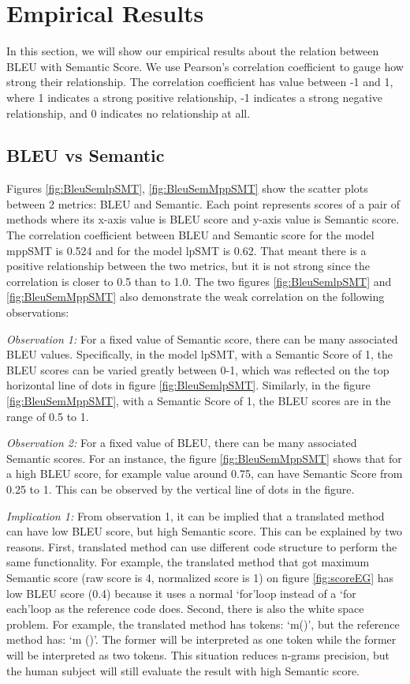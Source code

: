 \section{Empirical Results}
In this section, we will show our empirical results about the relation between BLEU with Semantic Score. We use Pearson\rq s correlation coefficient \cite{PearsonCorrelation}to gauge how strong their relationship. The correlation coefficient has value between -1 and 1, where 1 indicates a strong positive relationship, -1 indicates a strong negative relationship, and 0 indicates no relationship at all. 

\subsection{BLEU vs Semantic}
Figures \ref{fig:BleuSemlpSMT}, \ref{fig:BleuSemMppSMT}  show the scatter plots between 2 metrics: BLEU and Semantic. Each point represents scores of a pair of methods where its x-axis value is BLEU score and y-axis value is Semantic score.
The correlation coefficient between BLEU and Semantic score for the model mppSMT is 0.524 and for the model lpSMT is 0.62. That meant there is a positive relationship between the two metrics, but it is not strong since the correlation is closer to 0.5 than to 1.0. The two figures \ref{fig:BleuSemlpSMT} and \ref{fig:BleuSemMppSMT} also demonstrate the weak correlation on the following observations:  

\emph{Observation 1:} For a fixed value of Semantic score, there can be many associated BLEU values. Specifically, in the model lpSMT, with a Semantic Score of 1, the BLEU scores can be varied greatly between 0-1, which was reflected on the top horizontal line of dots in figure \ref{fig:BleuSemlpSMT}. Similarly, in the figure \ref{fig:BleuSemMppSMT}, with a Semantic Score of 1, the BLEU scores are in the range of 0.5 to 1. 

\emph{Observation 2:} For a fixed value of BLEU, there can be many associated Semantic scores. For an instance, the figure \ref{fig:BleuSemMppSMT} shows that for a high BLEU score, for example value around 0.75, can have Semantic Score from 0.25 to 1. This can be observed by the vertical line of dots in the figure. 

\emph{Implication 1: }From observation 1, it can be implied that a translated method can have low BLEU score, but high Semantic score. This can be explained by two reasons. First, translated method can use different code structure to perform the same functionality. For example, the translated method that got maximum Semantic score (raw score is 4, normalized score is 1) on figure \ref{fig:scoreEG} has low BLEU score (0.4) because it uses a normal \lq for\rq  loop instead of a \lq for each\rq  loop as the reference code does. Second, there is also the white space problem. For example, the translated method has tokens: \lq m()\rq, but the reference method has: \lq m ()\rq. The former will be interpreted as one token while the former will be interpreted as two tokens. This situation reduces n-grams precision, but the human subject will still evaluate the result with high Semantic score.     

